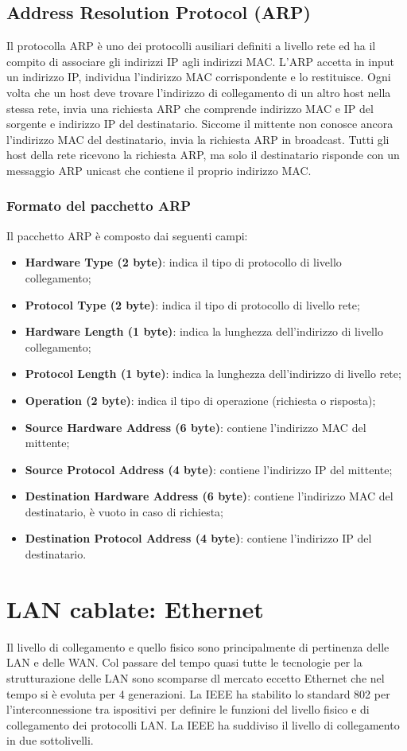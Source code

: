 \documentclass[12pt]{report}
\begin{document}
\subsection{Address Resolution Protocol (ARP)}
Il protocolla ARP è uno dei protocolli ausiliari definiti a livello rete ed ha il compito di associare gli indirizzi IP agli indirizzi MAC. L'ARP accetta in input un indirizzo IP, individua l'indirizzo MAC corrispondente e lo restituisce. Ogni volta che un host deve trovare l'indirizzo di collegamento di un altro host nella stessa rete, invia una richiesta ARP che comprende indirizzo MAC e IP del sorgente e indirizzo IP del destinatario. Siccome il mittente non conosce ancora l'indirizzo MAC del destinatario, invia la richiesta ARP in broadcast. Tutti gli host della rete ricevono la richiesta ARP, ma solo il destinatario risponde con un messaggio ARP unicast che contiene il proprio indirizzo MAC.

\subsubsection{Formato del pacchetto ARP}
Il pacchetto ARP è composto dai seguenti campi:
\begin{itemize}
	\item \textbf{Hardware Type (2 byte)}: indica il tipo di protocollo di livello collegamento;
	\item \textbf{Protocol Type (2 byte)}: indica il tipo di protocollo di livello rete;
	\item \textbf{Hardware Length (1 byte)}: indica la lunghezza dell'indirizzo di livello collegamento;
	\item \textbf{Protocol Length (1 byte)}: indica la lunghezza dell'indirizzo di livello rete;
	\item \textbf{Operation (2 byte)}: indica il tipo di operazione (richiesta o risposta);
	\item \textbf{Source Hardware Address (6 byte)}: contiene l'indirizzo MAC del mittente;
	\item \textbf{Source Protocol Address (4 byte)}: contiene l'indirizzo IP del mittente;
	\item \textbf{Destination Hardware Address (6 byte)}: contiene l'indirizzo MAC del destinatario, è vuoto in caso di richiesta;
	\item \textbf{Destination Protocol Address (4 byte)}: contiene l'indirizzo IP del destinatario.
\end{itemize}

\section{LAN cablate: Ethernet}
Il livello di collegamento e quello fisico sono principalmente di pertinenza delle LAN e delle WAN. Col passare del tempo quasi tutte le tecnologie per la strutturazione delle LAN sono scomparse dl mercato eccetto Ethernet che nel tempo si è evoluta per 4 generazioni. La IEEE ha stabilito lo standard 802 per l'interconnessione tra ispositivi per definire le funzioni del livello fisico e di collegamento dei protocolli LAN. La IEEE ha suddiviso il livello di collegamento in due sottolivelli.
\end{document}
